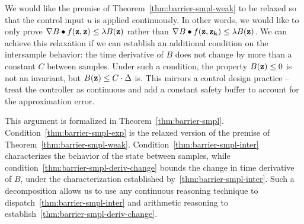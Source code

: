 We would like the premise of Theorem~\ref{thm:barrier-smpl-weak} to be
relaxed so that the control input $u$ is applied continuously. In other
words, we would like to only prove $\nabla B \bullet
f(\mathbf{z},\mathbf{z}) \leq \lambda B(\mathbf{z})$ rather than $\nabla
B \bullet f(\mathbf{z},\mathbf{z_k}) \leq \lambda B(\mathbf{z})$. We
can achieve this relaxation if we can establish an additional condition on
the intersample behavior: the time derivative of $B$ does not change by
more than a constant $C$ between samples. Under such a condition, the
property $B(\mathbf{z}) \leq 0$ is not an invariant, but $B(\mathbf{z})
\leq C\cdot \Delta$ is. This mirrors a control design practice -- treat the
controller as continuous and add a constant safety buffer to account for
the approximation error.

This argument is formalized in
Theorem~\ref{thm:barrier-smpl}. Condition~\eqref{thm:barrier-smpl-exp} is
the relaxed version of the premise of
Theorem~\ref{thm:barrier-smpl-weak}. Condition~\eqref{thm:barrier-smpl-inter}
characterizes the behavior of the state between samples, while
condition~\eqref{thm:barrier-smpl-deriv-change} bounds the change in time
derivative of $B$, under the characterization established
by~\eqref{thm:barrier-smpl-inter}. Such a decomposition allows us to use
any continuous reasoning technique to
dispatch~\eqref{thm:barrier-smpl-inter} and arithmetic reasoning to
establish~\eqref{thm:barrier-smpl-deriv-change}.

